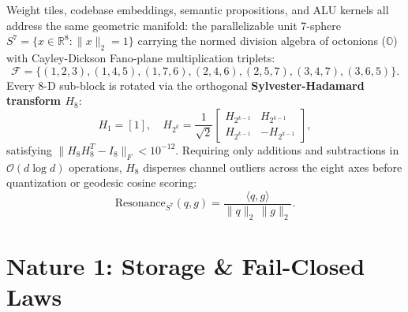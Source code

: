 \documentclass[10pt,twocolumn,letterpaper]{article}
\begin{document}
Weight tiles, codebase embeddings, semantic propositions, and ALU kernels all address the same geometric manifold: the parallelizable unit 7-sphere $S^7 = \{x \in \mathbb{R}^8 : \|x\|_2 = 1\}$ carrying the normed division algebra of octonions ($\mathbb{O}$) with Cayley-Dickson Fano-plane multiplication triplets:
\begin{equation}
\mathcal{F} = \{(1,2,3),(1,4,5),(1,7,6),(2,4,6),(2,5,7),(3,4,7),(3,6,5)\}.
\end{equation}
Every 8-D sub-block is rotated via the orthogonal \textbf{Sylvester-Hadamard transform $H_8$}:
\begin{equation}
H_1 = [1], \quad H_{2^k} = \frac{1}{\sqrt{2}} \begin{bmatrix} H_{2^{k-1}} & H_{2^{k-1}} \\ H_{2^{k-1}} & -H_{2^{k-1}} \end{bmatrix},
\end{equation}
satisfying $\|H_8 H_8^T - I_8\|_F < 10^{-12}$. Requiring only additions and subtractions in $\mathcal{O}(d \log d)$ operations, $H_8$ disperses channel outliers across the eight axes before quantization or geodesic cosine scoring:
\begin{equation}
\text{Resonance}_{S^7}(q, g) = \frac{\langle q, g \rangle}{\|q\|_2 \, \|g\|_2}.
\end{equation}

\section{Nature 1: Storage \& Fail-Closed Laws}
\end{document}
